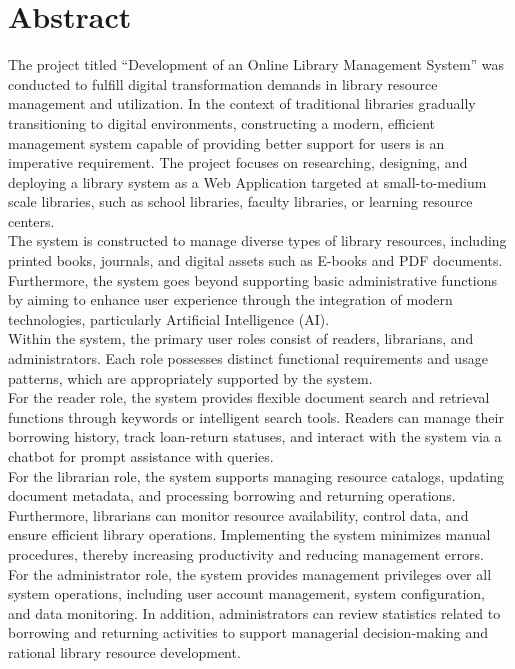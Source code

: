 \section*{Abstract}
\thispagestyle{empty}

The project titled “Development of an Online Library Management System” was conducted to fulfill digital transformation demands in library resource management and utilization. In the context of traditional libraries gradually transitioning to digital environments, constructing a modern, efficient management system capable of providing better support for users is an imperative requirement. The project focuses on researching, designing, and deploying a library system as a Web Application targeted at small-to-medium scale libraries, such as school libraries, faculty libraries, or learning resource centers. \\

The system is constructed to manage diverse types of library resources, including printed books, journals, and digital assets such as E-books and PDF documents. Furthermore, the system goes beyond supporting basic administrative functions by aiming to enhance user experience through the integration of modern technologies, particularly Artificial Intelligence (AI). \\

Within the system, the primary user roles consist of readers, librarians, and administrators. Each role possesses distinct functional requirements and usage patterns, which are appropriately supported by the system.\\

For the reader role, the system provides flexible document search and retrieval functions through keywords or intelligent search tools. Readers can manage their borrowing history, track loan-return statuses, and interact with the system via a chatbot for prompt assistance with queries.\\

For the librarian role, the system supports managing resource catalogs, updating document metadata, and processing borrowing and returning operations. Furthermore, librarians can monitor resource availability, control data, and ensure efficient library operations. Implementing the system minimizes manual procedures, thereby increasing productivity and reducing management errors.\\

For the administrator role, the system provides management privileges over all system operations, including user account management, system configuration, and data monitoring. In addition, administrators can review statistics related to borrowing and returning activities to support managerial decision-making and rational library resource development.\\

